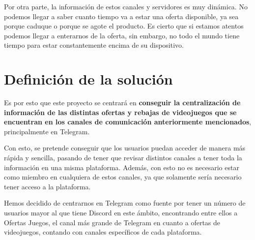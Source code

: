 Por otra parte, la información de estos canales y servidores es muy dinámica. No 
podemos llegar a saber cuanto tiempo va a estar una oferta disponible, ya sea 
porque caduque o porque se agote el producto. Es cierto que si estamos atentos 
podemos llegar a enterarnos de la oferta, sin embargo, no todo el mundo tiene tiempo 
para estar constantemente encima de su dispositivo.

\section{Definición de la solución}

Es por esto que este proyecto se centrará en \textbf{conseguir la centralización de 
información de las distintas ofertas y rebajas de videojuegos que se encuentran en 
los canales de comunicación anteriormente mencionados}, principalmente en Telegram.

Con esto, se pretende conseguir que los usuarios puedan acceder de manera más 
rápida y sencilla, pasando de tener que revisar distintos canales a tener toda la 
información en una misma plataforma. Además, con esto no es necesario estar 
como miembro en cualquiera de estos canales, ya que solamente sería necesario 
tener acceso a la plataforma.

Hemos decidido de centrarnos en Telegram como fuente por tener un número de 
usuarios mayor al que tiene Discord en este ámbito, encontrando entre ellos a 
Ofertas Juegos, el canal más grande de Telegram en cuanto a ofertas de videojuegos, 
contando con canales específicos de cada plataforma.
